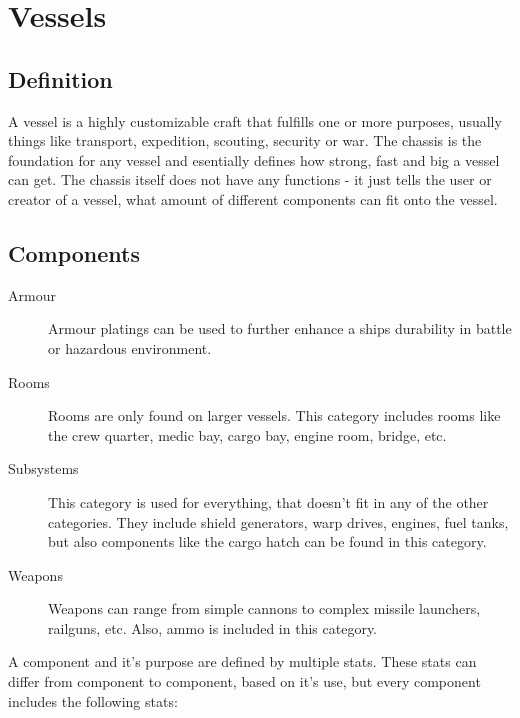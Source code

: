 \chapter{Vessels}
\label{chap:Vessels}

\section{Definition}
\label{sec:Vessels-Definition}

A vessel is a highly customizable craft that fulfills one or more purposes, usually things like transport, expedition, scouting, security or war. The chassis is the foundation for any vessel and esentially defines how strong, fast and big a vessel can get. The chassis itself does not have any functions - it just tells the user or creator of a vessel, what amount of different components can fit onto the vessel.

\section{Components}
\label{sec:Vessels-Components}

\begin{description}
  \item[Armour] Armour platings can be used to further enhance a ships durability in battle or hazardous environment.
  \item[Rooms] Rooms are only found on larger vessels. This category includes rooms like the crew quarter, medic bay, cargo bay, engine room, bridge, etc.
  \item[Subsystems] This category is used for everything, that doesn't fit in any of the other categories. They include shield generators, warp drives, engines, fuel tanks, but also components like the cargo hatch can be found in this category.
  \item[Weapons] Weapons can range from simple cannons to complex missile launchers, railguns, etc. Also, ammo is included in this category.
\end{description}

A component and it's purpose are defined by multiple stats. These stats can differ from component to component, based on it's use, but every component includes the following stats:

